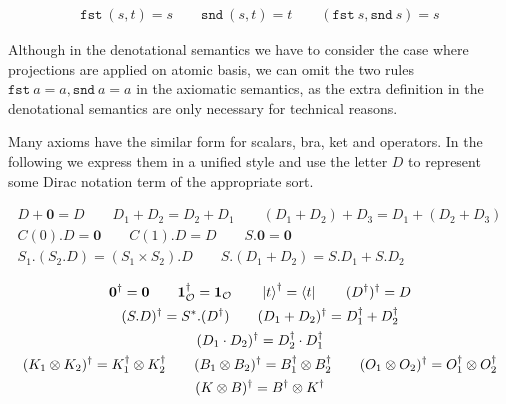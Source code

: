 \documentclass[manuscript, review, timestamp]{acmart}
\newcommand*{\fst}{\texttt{fst}}
\newcommand*{\snd}{\texttt{snd}}
\begin{document}
\begin{definition}[BASIS]
  \begin{gather*}
      \fst\ (s, t) = s
      \qquad
      \snd\ (s, t) = t
      \qquad
      (\fst\ s, \snd\ s) = s
  \end{gather*}
\end{definition}

Although in the denotational semantics we have to consider the case where projections are applied on atomic basis, we can omit the two rules 
$
\fst\ a = a,
\snd\ a = a
$
in the axiomatic semantics, as the extra definition in the denotational semantics are only necessary for technical reasons.



Many axioms have the similar form for scalars, bra, ket and operators. In the following we express them in a unified style and use the letter $D$ to represent some Dirac notation term of the appropriate sort.

\begin{definition}
  \begin{gather*}
    D + \mathbf{0} = D
    \qquad
    D_1 + D_2 = D_2 + D_1
    \qquad
    (D_1 + D_2) + D_3 = D_1 + (D_2 + D_3) \\
    C(0).D = \mathbf{0}
    \qquad
    C(1).D = D
    \qquad
    S.\mathbf{0} = \mathbf{0} \\
    S_1.(S_2.D) = (S_1 \times S_2).D
    \qquad
    S.(D_1 + D_2) = S.D_1 + S.D_2
  \end{gather*}
\end{definition}

\begin{definition}
  \begin{gather*}
    \textbf{0}^\dagger = \textbf{0}
    \qquad
    \mathbf{1}_\mathcal{O}^\dagger = \mathbf{1}_\mathcal{O}
    \qquad
    \ket{t}^\dagger = \bra{t}
    \qquad
    (D^\dagger)^\dagger = D \\
    (S.D)^\dagger = S^*.(D^\dagger)
    \qquad
    (D_1 + D_2)^\dagger = D_1^\dagger + D_2^\dagger \\
    (D_1 \cdot D_2)^\dagger = D_2^\dagger \cdot D_1^\dagger \\
    (K_1 \otimes K_2)^\dagger = K_1^\dagger \otimes K_2^\dagger
    \qquad
    (B_1 \otimes B_2)^\dagger = B_1^\dagger \otimes B_2^\dagger
    \qquad
    (O_1 \otimes O_2)^\dagger = O_1^\dagger \otimes O_2^\dagger \\
    (K \otimes B)^\dagger = B^\dagger \otimes K^\dagger
  \end{gather*}
\end{definition}
\end{document}
